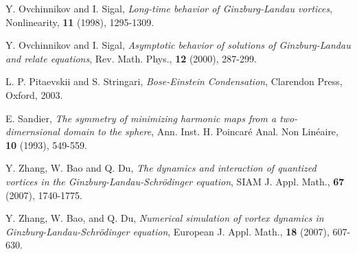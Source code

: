 \documentclass{aims}
\theoremstyle{plain}
\theoremstyle{definition}
\begin{document}
\begin{thebibliography}{99}
\newblock Y. Ovchinnikov and I. Sigal,
\newblock \emph{Long-time behavior of Ginzburg-Landau vortices},
\newblock Nonlinearity, \textbf{11} (1998), 1295-1309.

\newblock Y. Ovchinnikov and I. Sigal,
\newblock \emph{Asymptotic behavior of solutions of Ginzburg-Landau and relate equations},
\newblock Rev. Math. Phys., \textbf{12} (2000), 287-299.

\newblock L. P. Pitaevskii and S. Stringari,
\newblock \emph{Bose-Einstein Condensation},
\newblock Clarendon Press, Oxford, 2003.


\newblock E. Sandier,
\newblock \emph{The symmetry of minimizing harmonic maps from a two-dimernsional domain to the sphere},
\newblock Ann. Inst. H. Poincar\'e Anal. Non Lin\'eaire, \textbf{10} (1993), 549-559.

\newblock Y. Zhang, W. Bao and Q. Du,
\newblock \emph{The dynamics and interaction of quantized vortices in the Ginzburg-Landau-Schr\"odinger equation},
\newblock SIAM J. Appl. Math., \textbf{67} (2007), 1740-1775.

\newblock Y. Zhang, W. Bao, and Q. Du,
\newblock \emph{Numerical simulation of vortex dynamics in Ginzburg-Landau-Schr\"odinger equation},
\newblock European J. Appl. Math., \textbf{18} (2007), 607-630.






\end{thebibliography}

\end{document}
